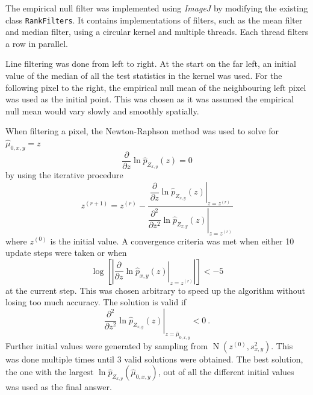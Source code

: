 \documentclass{proc}
\DeclareMathOperator{\normal}{N}
\begin{document}
The empirical null filter was implemented using \emph{ImageJ} \citep{abramoff2004image, schindelin2012fiji, schneider2012nih, perez2013image} by modifying the existing class \texttt{RankFilters}. It contains implementations of filters, such as the mean filter and median filter, using a circular kernel and multiple threads. Each thread filters a row in parallel.

Line filtering was done from left to right. At the start on the far left, an initial value of the median of all the test statistics in the kernel was used. For the following pixel to the right, the empirical null mean of the neighbouring left pixel was used as the initial point. This was chosen as it was assumed the empirical null mean would vary slowly and smoothly spatially.

When filtering a pixel, the Newton-Raphson method was used to solve for $\widehat{\mu}_{0,x,y}=z$
\begin{equation}
  \dfrac{\partial}{\partial z}\ln\widehat{p}_{Z_{x,y}}(z) = 0
\end{equation}
by using the iterative procedure
\begin{equation}
  z^{(r+1)} =
  z^{(r)}
  -\dfrac{
    \left.
      \dfrac{
        \partial
      }
      {
        \partial z
      }
      \ln\widehat{p}_{Z_{x,y}}(z)
    \right|_{z = z^{(r)}}
  }
  {
    \left.
      \dfrac{
        \partial^2
      }
      {
        \partial z^2
      }
      \ln\widehat{p}_{Z_{x,y}}(z)
    \right|_{z = z^{(r)}}
  } 
\end{equation}
where $z^{(0)}$ is the initial value. A convergence criteria was met when either 10 update steps were taken or when
\begin{equation}
  \log\left[\left|
    \left.
    \dfrac{
      \partial
    }
    {
      \partial z
    }
  \ln\widehat{p}_{x,y}(z)
  \right|_{z=z^{(r)}}
  \right|\right]
  <-5
\end{equation}
at the current step. This was chosen arbitrary to speed up the algorithm without losing too much accuracy. The solution is valid if
\begin{equation}
  \left.
    \dfrac{
      \partial^2
    }
    {
      \partial z^2
    }
    \ln\widehat{p}_{Z_{x,y}}(z)
  \right|_{z=\widehat{\mu}_{0,x,y}}
  < 0 \ .
\end{equation}
Further initial values were generated by sampling from $\normal(z^{(0)}, s_{x,y}^2)$. This was done multiple times until 3 valid solutions were obtained. The best solution, the one with the largest $\ln\widehat{p}_{Z_{x,y}}\left(\widehat{\mu}_{0,x,y}\right)$, out of all the different initial values was used as the final answer.
\end{document}
